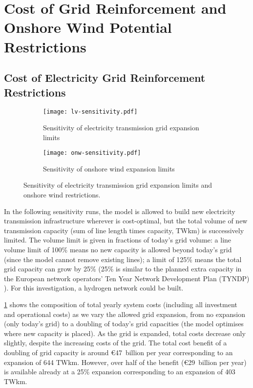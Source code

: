 \section{Cost of Grid Reinforcement and Onshore Wind Potential Restrictions}
\label{sec:si:sensitivity-lv-onw}

\subsection{Cost of Electricity Grid Reinforcement Restrictions}
\label{sec:si:lv}

\begin{figure}
    \centering
    \begin{subfigure}[t]{\textwidth}
        \centering
        \caption{Sensitivity of electricity transmission grid expansion limits}
        \texttt{[image: lv-sensitivity.pdf]}
        \label{fig:lv-restriction}
    \end{subfigure}
    \begin{subfigure}[t]{\textwidth}
        \centering
        \caption{Sensitivity of onshore wind expansion limits}
        \texttt{[image: onw-sensitivity.pdf]}
        \label{fig:onw-restriction}
    \end{subfigure}
    \caption{Sensitivity of electricity transmission grid expansion limits and onshore wind restrictions.}
    \label{fig:lv-onw-restriction}
\end{figure}

In the following sensitivity runs, the model is allowed to build new electricity
transmission infrastructure wherever is cost-optimal, but the total volume of
new transmission capacity (sum of line length times capacity, TWkm) is
successively limited. The volume limit is given in fractions of today's grid
volume: a line volume limit of 100\% means no new capacity is allowed beyond
today's grid (since the model cannot remove existing lines); a limit of 125\%
means the total grid capacity can grow by 25\% (25\% is similar to the planned
extra capacity in the European network operators' Ten Year Network Development
Plan (TYNDP) \cite{TYNDP2016}). For this investigation, a hydrogen network
could be built.

\cref{fig:lv-restriction} shows the composition of total yearly system costs
(including all investment and operational costs) as we vary the allowed grid
expansion, from no expansion (only today's grid) to a doubling of today's grid
capacities (the model optimises where new capacity is placed). As the grid is
expanded, total costs decrease only slightly, despite the increasing costs of
the grid. The total cost benefit of a doubling of grid capacity is around
\euro47~billion per year corresponding to an expansion of 644 TWkm. However, over
half of the benefit (\euro29~billion per year) is available already at a 25\%
expansion corresponding to an expansion of 403 TWkm.

